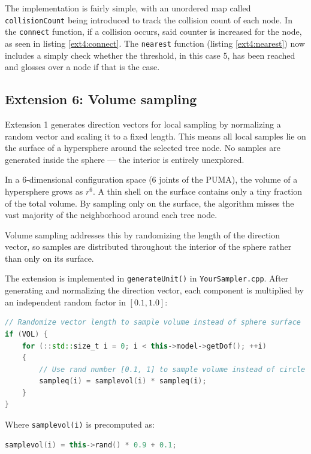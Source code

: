 \documentclass[a4paper,12pt]{article}
\begin{document}
The implementation is fairly simple, with an unordered map called \texttt{collisionCount} being introduced to track the collision count of each node.
In the \texttt{connect} function, if a collision occurs, said counter is increased for the node, as seen in listing \ref{ext4:connect}.
The \texttt{nearest} function (listing \ref{ext4:nearest}) now includes a simply check whether the threshold, in this case 5, has been reached and glosses over a node if that is the case.


\subsection*{Extension 6: Volume sampling} %
Extension 1 generates direction vectors for local sampling by normalizing a random vector and scaling it to a fixed length. This means all local samples lie on the surface of a hypersphere around the selected tree node. No samples are generated inside the sphere --- the interior is entirely unexplored.

In a 6-dimensional configuration space (6 joints of the PUMA), the volume of a hypersphere grows as $r^6$. A thin shell on the surface contains only a tiny fraction of the total volume. By sampling only on the surface, the algorithm misses the vast majority of the neighborhood around each tree node.

Volume sampling addresses this by randomizing the length of the direction vector, so samples are distributed throughout the interior of the sphere rather than only on its surface.

The extension is implemented in \texttt{generateUnit()} in \texttt{YourSampler.cpp}. After generating and normalizing the direction vector, each component is multiplied by an independent random factor in $[0.1, 1.0]$:

\begin{lstlisting}[language=C++, caption=Implementation of Extension 6]
// Randomize vector length to sample volume instead of sphere surface
if (VOL) {
    for (::std::size_t i = 0; i < this->model->getDof(); ++i)
    {
        // Use rand number [0.1, 1] to sample volume instead of circle
        sampleq(i) = samplevol(i) * sampleq(i);
    }
}
\end{lstlisting}

Where \texttt{samplevol(i)} is precomputed as:
\begin{lstlisting}[language=C++]
samplevol(i) = this->rand() * 0.9 + 0.1;
\end{lstlisting}
\end{document}
